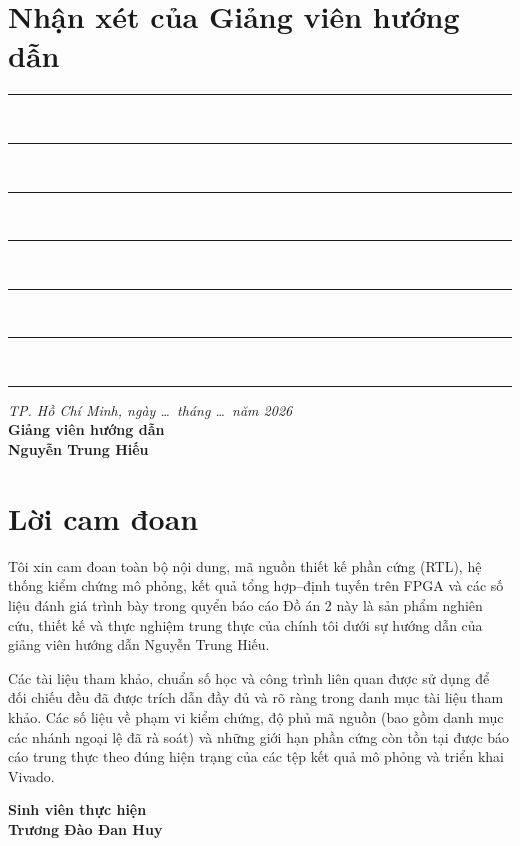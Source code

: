 \clearpage
\chapter*{Nhận xét của Giảng viên hướng dẫn}
\vspace{4mm}
\noindent\rule{\linewidth}{0.4pt}\\[10mm]
\noindent\rule{\linewidth}{0.4pt}\\[10mm]
\noindent\rule{\linewidth}{0.4pt}\\[10mm]
\noindent\rule{\linewidth}{0.4pt}\\[10mm]
\noindent\rule{\linewidth}{0.4pt}\\[10mm]
\noindent\rule{\linewidth}{0.4pt}\\[10mm]
\noindent\rule{\linewidth}{0.4pt}

\vspace{16mm}
\hfill\begin{minipage}{65mm}
  \centering
  \textit{TP. Hồ Chí Minh, ngày \ldots\ tháng \ldots\ năm 2026}\\
  \textbf{Giảng viên hướng dẫn}\\[22mm]
  \textbf{Nguyễn Trung Hiếu}
\end{minipage}

\clearpage
\chapter*{Lời cam đoan}
Tôi xin cam đoan toàn bộ nội dung, mã nguồn thiết kế phần cứng (RTL), hệ thống kiểm chứng mô phỏng, kết quả tổng hợp--định tuyến trên FPGA và các số liệu đánh giá trình bày trong quyển báo cáo Đồ án 2 này là sản phẩm nghiên cứu, thiết kế và thực nghiệm trung thực của chính tôi dưới sự hướng dẫn của giảng viên hướng dẫn Nguyễn Trung Hiếu.

Các tài liệu tham khảo, chuẩn số học và công trình liên quan được sử dụng để đối chiếu đều đã được trích dẫn đầy đủ và rõ ràng trong danh mục tài liệu tham khảo. Các số liệu về phạm vi kiểm chứng, độ phủ mã nguồn (bao gồm danh mục các nhánh ngoại lệ đã rà soát) và những giới hạn phần cứng còn tồn tại được báo cáo trung thực theo đúng hiện trạng của các tệp kết quả mô phỏng và triển khai Vivado.

\vspace{14mm}
\hfill\begin{minipage}{60mm}
  \centering
  \textbf{Sinh viên thực hiện}\\[20mm]
  \textbf{Trương Đào Đan Huy}
\end{minipage}

